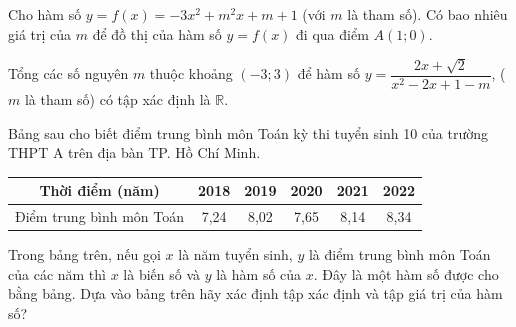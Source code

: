 
\begin{bt}%
	Cho hàm số $y=f(x)=-3x^2+m^2x+m+1$ (với $m$ là tham số). Có bao nhiêu giá trị của $m$ để đồ thị của hàm  số $y=f(x)$ đi qua điểm $A(1;0)$.
\end{bt}

\begin{bt}%
	Tổng  các số nguyên $m$ thuộc khoảng $(-3;3)$ để hàm số $y=\dfrac{2x+\sqrt 2}{x^2-2x+1-m}$, ($m$ là tham số) có tập xác định là $\mathbb{R}$.
\end{bt}

\begin{bt}%
		Bảng sau cho biết điểm trung bình môn Toán kỳ thi tuyển sinh 10 của trường THPT A trên địa bàn TP. Hồ Chí Minh.
		\begin{center}
			\begin{tabular}[t]{|c|c|c|c|c|c|}\hline
				Thời điểm (năm)&2018&2019&2020&2021&2022\\ \hline
				Điểm trung bình môn Toán&7,24&8,02&7,65&8,14&8,34\\ \hline
			\end{tabular}
		\end{center}
		Trong bảng trên, nếu gọi $x$ là năm tuyển sinh, $y$ là điểm trung bình môn Toán của các năm thì $x$ là biến số và $y$ là hàm số của $x$. Đây là một hàm số được cho bằng bảng. Dựa vào bảng trên hãy xác định tập xác định và tập giá trị của hàm số?		
	\end{bt}

